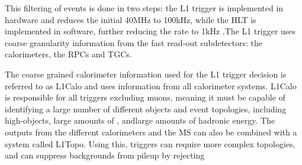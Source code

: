 This filtering of events is done in two steps: the \ac{L1} trigger is implemented in hardware and reduces the initial 40MHz to 100kHz, while the \ac{HLT} is implemented in software, further reducing the rate to 1kHz \cite{ATL-DAQ-PUB-2016-001}.The \ac{L1} trigger uses coarse granularity information from the fast read-out subdetectors: the calorimeters, the \acp{RPC} and \acp{TGC}. 

The coarse grained calorimeter information used for the \ac{L1} trigger decision is referred to as \ac{L1Calo} and uses information from all calorimeter systems. \ac{L1Calo} is responsible for all triggers excluding muons, meaning it must be capable of identifying a large number of different objects and event topologies, including high-\pt objects, large amounts of \met, andlarge amounts of hadronic energy.  
The outputs from the different calorimeters and the \ac{MS} can also be combined with a system called \ac{L1Topo}. Using this, triggers can require more complex topologies, and can suppress backgrounds from pileup by rejecting  



